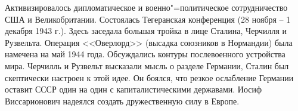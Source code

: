 Активизировалось дипломатическое и военно"=политическое сотрудничество США и Великобритании. Состоялась Тегеранская конференция (28 ноября -- 1 декабря 1943 г.). Здесь заседала большая тройка в лице Сталина, Черчилля и Рузвельта. Операция <<Оверлорд>> (высадка союзников в Нормандии) была намечена на май 1944 года. Обсуждались контуры послевоенного устройства мира. Черчилль и Рузвельт высказали мысль о разделе Германии, Сталин был скептически настроен к этой идее. Он боялся, что резкое ослабление Германии оставит СССР один на один с капиталистическими державами. Иосиф Виссарионович надеялся создать дружественную силу в Европе.
